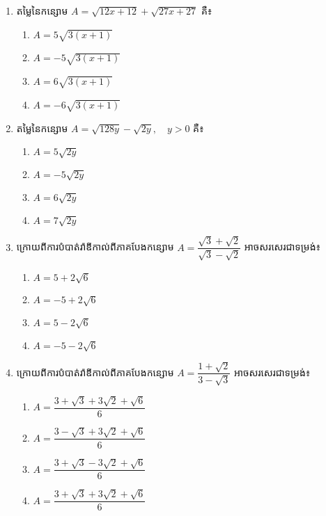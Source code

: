 \begin{enumerate}
\item តម្លៃនៃកន្សោម $A=\sqrt{12x+12}+\sqrt{27x+27}$ គឺ៖
\begin{multicols}{2}
\begin{enumerate}[label=\alph*.]
	\item $A=5\sqrt{3(x+1)}$
	\item $A=-5\sqrt{3(x+1)}$
	\item $A=6\sqrt{3(x+1)}$
	\item $A=-6\sqrt{3(x+1)}$
\end{enumerate}
\end{multicols}

\item តម្លៃនៃកន្សោម $A=\sqrt{128y}-\sqrt{2y},\quad y>0$ គឺ៖
\begin{multicols}{2}
\begin{enumerate}[label=\alph*.]
	\item $A=5\sqrt{2y}$
	\item $A=-5\sqrt{2y}$
	\item $A=6\sqrt{2y}$
	\item $A=7\sqrt{2y}$
\end{enumerate}
\end{multicols}

\item ក្រោយពីការបំបាត់រ៉ាឌីកាល់ពីភាគបែងកន្សោម $A=\dfrac{\sqrt{3}+\sqrt{2}}{\sqrt{3}-\sqrt{2}}$ អាចសរសេរជាទម្រង់៖
\begin{multicols}{2}
\begin{enumerate}[label=\alph*.]
	\item $A=5+2\sqrt{6}$
	\item  $A=-5+2\sqrt{6}$
	\item $A=5-2\sqrt{6}$
	\item  $A=-5-2\sqrt{6}$
\end{enumerate}
\end{multicols}

\item ក្រោយពីការបំបាត់រ៉ាឌីកាល់ពីភាគបែងកន្សោម $A=\dfrac{1+\sqrt{2}}{3-\sqrt{3}}$ អាចសរសេរជាទម្រង់៖
\begin{multicols}{2}
\begin{enumerate}[label=\alph*.]
	\item $A=\dfrac{3+\sqrt{3}+3\sqrt{2}+\sqrt{6}}{6}$
	\item  $A=\dfrac{3-\sqrt{3}+3\sqrt{2}+\sqrt{6}}{6}$
	\item $A=\dfrac{3+\sqrt{3}-3\sqrt{2}+\sqrt{6}}{6}$
	\item  $A=\dfrac{3+\sqrt{3}+3\sqrt{2}+\sqrt{6}}{6}$
\end{enumerate}
\end{multicols}


\end{enumerate}
